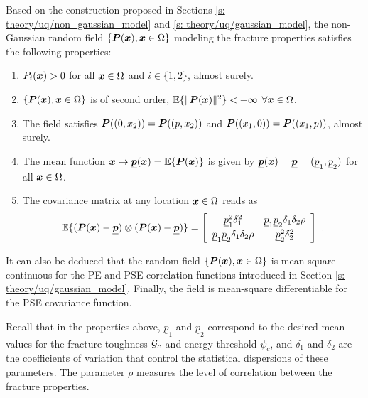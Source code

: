 Based on the construction proposed in Sections \ref{s: theory/uq/non_gaussian_model} and \ref{s: theory/uq/gaussian_model}, the non-Gaussian random field $\{\boldsymbol{P}(\boldsymbol{x}), \boldsymbol{x} \in \Omega\}$ modeling the fracture properties satisfies the following properties:
\begin{enumerate}
  \item $P_i(\boldsymbol{x}) > 0$ for all $\boldsymbol{x} \in \Omega$ and $i \in \{1,2\}$, almost surely.
  \item $\{\boldsymbol{P}(\boldsymbol{x}), \boldsymbol{x} \in \Omega\}$ is of second order, $\mathbb{E}\{\|\boldsymbol{P}(\boldsymbol{x})\|^2\} < + \infty$ $\forall \boldsymbol{x} \in \Omega$.
  \item The field satisfies $\boldsymbol{P}((0, x_2)) = \boldsymbol{P}((p, x_2))$ and $\boldsymbol{P}((x_1, 0)) = \boldsymbol{P}((x_1, p))$, almost surely.
  \item The mean function $\boldsymbol{x} \mapsto \underline{\boldsymbol{p}}(\boldsymbol{x}) = \mathbb{E}\{\boldsymbol{P}(\boldsymbol{x})\}$ is given by $\underline{\boldsymbol{p}}(\boldsymbol{x}) = \underline{\boldsymbol{p}} = (\underline{p}_1, \underline{p}_2)$ for all $\boldsymbol{x} \in \Omega$.
  \item The covariance matrix at any location $\boldsymbol{x} \in \Omega$ reads as
        \begin{align}
          \mathbb{E}\{(\boldsymbol{P}(\boldsymbol{x}) - \underline{\boldsymbol{p}}) \otimes (\boldsymbol{P}(\boldsymbol{x}) - \underline{\boldsymbol{p}})\} = \left[\begin{array}{cc} \underline{p}_1^2 \delta_1^2 &  \underline{p}_1 \underline{p}_2 \delta_1  \delta_2 \rho  \\[1mm] \underline{p}_1 \underline{p}_2 \delta_1  \delta_2 \rho & \underline{p}_2^2 \delta_2^2 \end{array}\right]~.
        \end{align}
\end{enumerate}
It can also be deduced that the random field $\{\boldsymbol{P}(\boldsymbol{x}), \boldsymbol{x} \in \Omega\}$ is mean-square continuous for the PE and PSE correlation functions introduced in Section \ref{s: theory/uq/gaussian_model}. Finally, the field is mean-square differentiable for the PSE covariance function.

Recall that in the properties above, $\underline{p}_1$ and $\underline{p}_2$ correspond to the desired mean values for the fracture toughness ${\mathcal{G}_c}$ and energy threshold $\psi_c$, and $\delta_1$ and $\delta_2$ are the coefficients of variation that control the statistical dispersions of these parameters. The parameter $\rho$ measures the level of correlation between the fracture properties.

